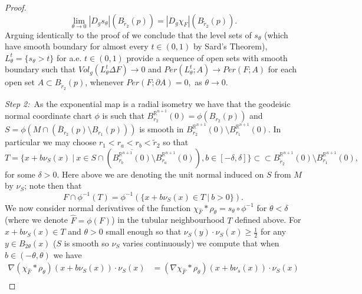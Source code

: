 \documentclass[11pt]{article}
\begin{document}
\begin{proof}
\begin{equation*}
    \lim_{\theta \rightarrow 0} |D_g s_\theta|(B_{\tilde{r}_2}(p)) = |D_g \chi_F|(B_{\tilde{r}_2}(p)). 
\end{equation*}
Arguing identically to the proof of \cite[Theorem 13.8]{maggi_2012} we conclude that the level sets of $s_\theta$ (which have smooth boundary for almost every $t \in (0,1)$ by Sard's Theorem), $L^t_\theta = \{s_\theta > t\}$ for a.e. $t \in (0,1)$ provide a sequence of open sets with smooth boundary such that $Vol_g(L^t_\theta \Delta F) \rightarrow 0$ and $Per(L^t_\theta ; A) \rightarrow Per(F ; A)$ for each open set $A \subset B_{\tilde{r}_2}(p)$, whenever $Per(F ; \partial A) = 0,$ as $\theta \rightarrow 0$.

\bigskip

\textit{Step 2:}~As the exponential map is a radial isometry we have that the geodeisic normal coordinate chart $\phi$ is such that $B_{r_2}^{\mathbb{R}^{n+1}}(0) = \phi(B_{r_2}(p))$ and $S = \phi\left(M \cap (\overline{B}_{r_2}(p) \setminus B_{r_1}(p))\right)$ is smooth in $B_{r_2}^{\mathbb{R}^{n+1}}(0) \setminus B_{r_1}^{\mathbb{R}^{n+1}}(0)$. In particular we may choose $r_1 < r_a < r_b < \tilde{r}_2$ so that
\begin{equation*}
    T = \{x + b\nu_S(x) \: | \: x \in S \cap (\overline{B_{r_b}^{\mathbb{R}^{n+1}}(0)} \setminus B_{r_a}^{\mathbb{R}^{n+1}}(0)), b \in [-\delta,\delta]\} \subset \subset B_{\tilde{r}_2}^{\mathbb{R}^{n+1}}(0) \setminus B_{r_1}^{\mathbb{R}^{n+1}}(0),
\end{equation*} 
for some $\delta > 0$. Here above we are denoting the unit normal induced on $S$ from $M$ by $\nu_S$; note then that 
\begin{equation}\label{eqn: E in $T$}
    F \cap \phi^{-1}(T) = \phi^{-1}(\{x + b\nu_S(x) \in T \: | \: b > 0\}).
\end{equation}
We now consider normal derivatives of the function $\chi_{\widehat{F}} * \rho_\theta = s_\theta \circ \phi^{-1}$ for $\theta < \delta$ (where we denote $\widehat{F} = \phi(F)$) in the tubular neighbourhood $T$ defined above. For $x + b\nu_S(x) \in T$ and $\theta > 0$ small enough so that $\nu_S(y) \cdot \nu_S(x) \geq \frac{1}{2}$ for any $y \in B_{2\theta}(x)$ ($S$ is smooth so $\nu_S$ varies continuously) we compute that when $b \in (-\theta,\theta)$ we have
\begin{align*}
    \nabla (\chi_{\widehat{F}} * \rho_\theta)(x + b\nu_S(x)) \cdot \nu_S(x) &= (\nabla \chi_{\widehat{F}} * \rho_\theta) (x + b\nu_s(x)) \cdot \nu_S(x) \\

\end{align*}
\end{proof}
\end{document}
